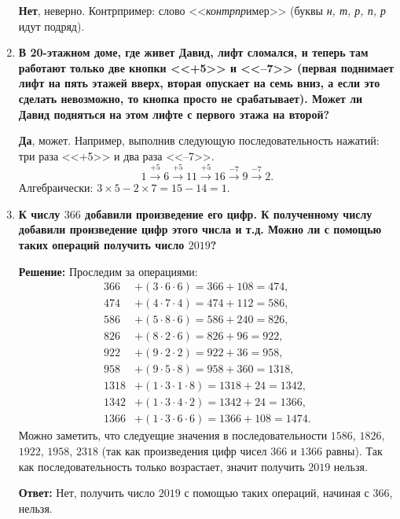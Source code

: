 \documentclass[12pt, a4paper]{article}
\begin{document}
\begin{enumerate}[label=\arabic*., wide=0pt, leftmargin=*]
    \textbf{Нет}, неверно. Контрпример: слово <<\emph{контрпр}имер>> (буквы \emph{н, т, р, п, р} идут подряд).

    \item \textbf{В 20-этажном доме, где живет Давид, лифт сломался, и теперь там работают только две кнопки <<+5>> и <<–7>> (первая поднимает лифт на пять этажей вверх, вторая опускает на семь вниз, а если это сделать невозможно, то кнопка просто не срабатывает). Может ли Давид подняться на этом лифте с первого этажа на второй?}

    \textbf{Да}, может. Например, выполнив следующую последовательность нажатий: три раза <<+5>> и два раза <<–7>>.
    \[
    1 \xrightarrow{+5} 6 \xrightarrow{+5} 11 \xrightarrow{+5} 16 \xrightarrow{-7} 9 \xrightarrow{-7} 2.
    \]
    Алгебраически: $3 \times 5 - 2 \times 7 = 15 - 14 = 1$.

    \item \textbf{К числу $366$ добавили произведение его цифр. К полученному числу добавили произведение цифр этого числа и т.д. Можно ли с помощью таких операций получить число $2019$?}

    \textbf{Решение:}
    Проследим за операциями:
    \begin{align*}
    366 &+ (3 \cdot 6 \cdot 6) = 366 + 108 = 474, \\
    474 &+ (4 \cdot 7 \cdot 4) = 474 + 112 = 586, \\
    586 &+ (5 \cdot 8 \cdot 6) = 586 + 240 = 826, \\
    826 &+ (8 \cdot 2 \cdot 6) = 826 + 96 = 922, \\
    922 &+ (9 \cdot 2 \cdot 2) = 922 + 36 = 958, \\
    958 &+ (9 \cdot 5 \cdot 8) = 958 + 360 = 1318, \\
    1318 &+ (1 \cdot 3 \cdot 1 \cdot 8) = 1318 + 24 = 1342, \\
    1342 &+ (1 \cdot 3 \cdot 4 \cdot 2) = 1342 + 24 = 1366, \\
    1366 &+ (1 \cdot 3 \cdot 6 \cdot 6) = 1366 + 108 = 1474.
    \end{align*}
    Можно заметить, что следуещие значения в последовательности $1586$, $1826$, $1922$, $1958$, $2318$ (так как произведения цифр чисел $366$ и $1366$ равны). Так как последовательность только возрастает, значит получить $2019$ нельзя.

    \textbf{Ответ:} Нет, получить число $2019$ с помощью таких операций, начиная с $366$, нельзя.
\end{enumerate}
\end{document}
